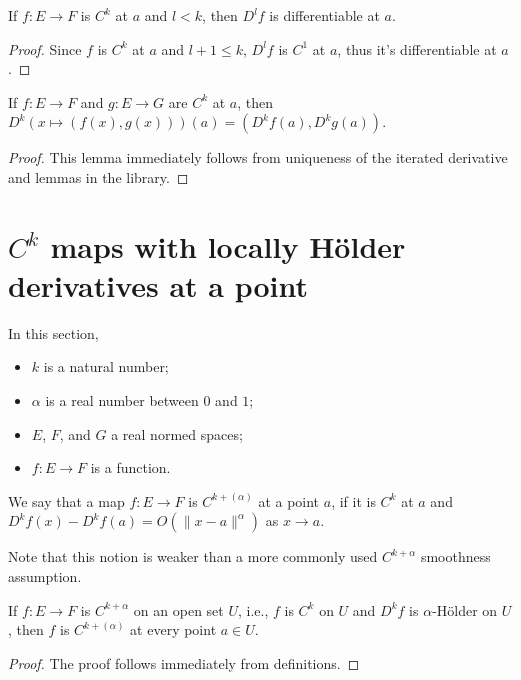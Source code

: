 \begin{lemma}%
  \label{lem:Ck-differentiable-iteratedFDeriv}
  \leanok%
  If \(f \colon E \to F\) is \(C^{k}\) at \(a\) and \(l < k\),
  then \(D^{l}f\) is differentiable at \(a\).
\end{lemma}
\begin{proof}
  \leanok%
  Since \(f\) is \(C^{k}\) at \(a\) and \(l + 1 \le k\),
  \(D^{l}f\) is \(C^{1}\) at \(a\),
  thus it's differentiable at \(a\).
\end{proof}

\begin{lemma}%
  \label{lem:iteratedFDeriv-prod}
  If \(f\colon E \to F\) and \(g\colon E \to G\) are \(C^{k}\) at \(a\),
  then \(D^{k}(x \mapsto (f(x), g(x)))(a) = (D^{k}f(a), D^{k}g(a))\).
\end{lemma}
\begin{proof}
  This lemma immediately follows from uniqueness of the iterated derivative
  and lemmas in the library.
\end{proof}

\section{\(C^{k}\) maps with locally Hölder derivatives at a point}%
\label{sec:cdh-at}

In this section,
\begin{itemize}
\item \(k\) is a natural number;
\item \(\alpha\) is a real number between \(0\) and \(1\);
\item \(E\), \(F\), and \(G\) a real normed spaces;
\item \(f\colon E \to F\) is a function.
\end{itemize}

\begin{definition}%
  \label{def:cdh-at}
  \leanok%
  We say that a map \(f\colon E\to F\) is \emph{\(C^{k+(\alpha)}\)} at a point \(a\),
  if it is \(C^{k}\) at \(a\) and \(D^{k}f(x) - D^{k}f(a) = O(\|x - a\|^{\alpha})\) as \(x\to a\).
\end{definition}

Note that this notion is weaker than a more commonly used \(C^{k+\alpha}\) smoothness assumption.
\begin{lemma}%
  \label{def:contdiffholder-imp-cdh-at}
  \leanok%
  If \(f\colon E \to F\) is \(C^{k+\alpha}\) on an open set \(U\),
  i.e., \(f\) is \(C^{k}\) on \(U\) and \(D^{k}f\) is \(\alpha\)-Hölder on \(U\),
  then \(f\) is \(C^{k+(\alpha)}\) at every point \(a \in U\).
\end{lemma}
\begin{proof}
  \leanok%
  The proof follows immediately from definitions.
\end{proof}

